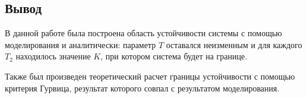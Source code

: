 \documentclass[a4paper,12pt]{article}
\begin{document}
 
 	\clearpage
 		\begin{center}
 	 \section*{Вывод}
 		\end{center}
 	
 	В данной работе была построена область устойчивости системы с помощью моделирования и аналитически: параметр $T$ оставался неизменным и для каждого $T_2$ находилось значение $K$, при котором система будет на границе.  
 	\par Также был произведен теоретический расчет границы устойчивости с помощью критерия Гурвица, результат которого совпал с результатом моделирования. 
	
	
	
	
\end{document}

